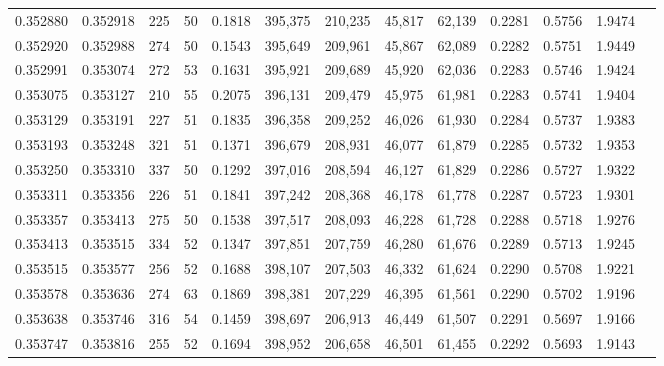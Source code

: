 \begin{tabular}{rrrrrrrrrrrrr}
0.352880 & 0.352918 &   225 &  50 &                                     0.1818 & 395,375 & 210,235 &  45,817 &  62,139 & 0.2281 & 0.5756 & 1.9474 \\
0.352920 & 0.352988 &   274 &  50 &                                     0.1543 & 395,649 & 209,961 &  45,867 &  62,089 & 0.2282 & 0.5751 & 1.9449 \\
0.352991 & 0.353074 &   272 &  53 &                                     0.1631 & 395,921 & 209,689 &  45,920 &  62,036 & 0.2283 & 0.5746 & 1.9424 \\
0.353075 & 0.353127 &   210 &  55 &                                     0.2075 & 396,131 & 209,479 &  45,975 &  61,981 & 0.2283 & 0.5741 & 1.9404 \\
0.353129 & 0.353191 &   227 &  51 &                                     0.1835 & 396,358 & 209,252 &  46,026 &  61,930 & 0.2284 & 0.5737 & 1.9383 \\
0.353193 & 0.353248 &   321 &  51 &                                     0.1371 & 396,679 & 208,931 &  46,077 &  61,879 & 0.2285 & 0.5732 & 1.9353 \\
0.353250 & 0.353310 &   337 &  50 &                                     0.1292 & 397,016 & 208,594 &  46,127 &  61,829 & 0.2286 & 0.5727 & 1.9322 \\
0.353311 & 0.353356 &   226 &  51 &                                     0.1841 & 397,242 & 208,368 &  46,178 &  61,778 & 0.2287 & 0.5723 & 1.9301 \\
0.353357 & 0.353413 &   275 &  50 &                                     0.1538 & 397,517 & 208,093 &  46,228 &  61,728 & 0.2288 & 0.5718 & 1.9276 \\
0.353413 & 0.353515 &   334 &  52 &                                     0.1347 & 397,851 & 207,759 &  46,280 &  61,676 & 0.2289 & 0.5713 & 1.9245 \\
0.353515 & 0.353577 &   256 &  52 &                                     0.1688 & 398,107 & 207,503 &  46,332 &  61,624 & 0.2290 & 0.5708 & 1.9221 \\
0.353578 & 0.353636 &   274 &  63 &                                     0.1869 & 398,381 & 207,229 &  46,395 &  61,561 & 0.2290 & 0.5702 & 1.9196 \\
0.353638 & 0.353746 &   316 &  54 &                                     0.1459 & 398,697 & 206,913 &  46,449 &  61,507 & 0.2291 & 0.5697 & 1.9166 \\
0.353747 & 0.353816 &   255 &  52 &                                     0.1694 & 398,952 & 206,658 &  46,501 &  61,455 & 0.2292 & 0.5693 & 1.9143 \\

\end{tabular}
